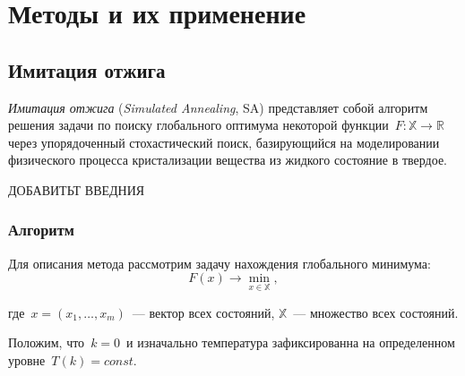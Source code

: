 \chapter{Методы и их применение} \label{chap2}

\section{Имитация отжига}

\noindent
\textit{Имитация отжига} (\emph{Simulated Annealing}, SA) представляет собой алгоритм решения задачи по поиску глобального оптимума некоторой функции~$F\colon \mathbb{X} \to \mathbb{R}$ через упорядоченный стохастический поиск, базирующийся на моделировании физического процесса кристализации вещества из жидкого состояние в твердое.

ДОБАВИТЬТ ВВЕДНИЯ

\subsection{Алгоритм}

\noindent Для описания метода рассмотрим задачу нахождения глобального минимума:
\[
	F(x) \to \min \limits _{x \in \mathbb{X}},
\]

\noindent где~$x = (x_{1},\ldots , x_{m})$~--- вектор всех состояний, $\mathbb{X}$~--- множество всех состояний.

Положим, что~$k = 0$~и изначально температура зафиксированна на определенном уровне~$T(k) = const$.


